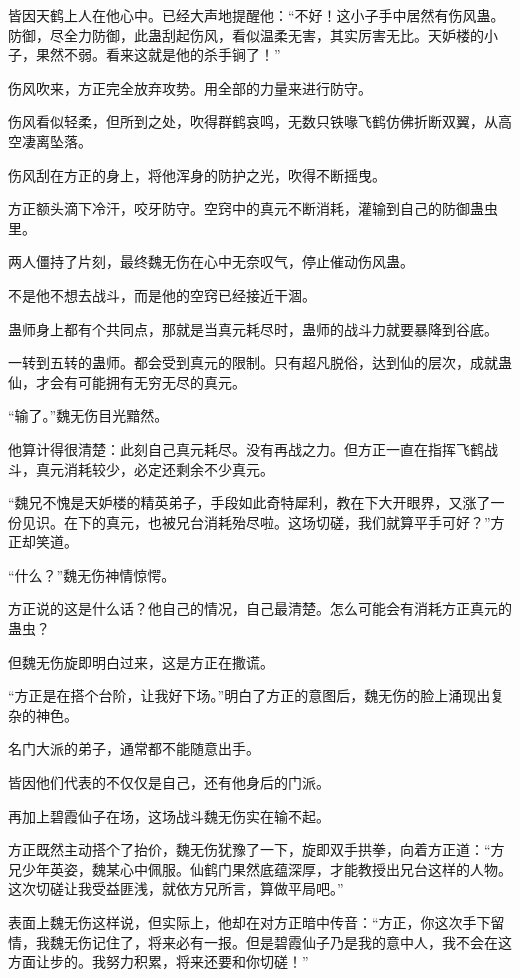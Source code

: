 \begin{this_body}
皆因天鹤上人在他心中。已经大声地提醒他：“不好！这小子手中居然有伤风蛊。防御，尽全力防御，此蛊刮起伤风，看似温柔无害，其实厉害无比。天妒楼的小子，果然不弱。看来这就是他的杀手锏了！”

伤风吹来，方正完全放弃攻势。用全部的力量来进行防守。

伤风看似轻柔，但所到之处，吹得群鹤哀鸣，无数只铁喙飞鹤仿佛折断双翼，从高空凄离坠落。

伤风刮在方正的身上，将他浑身的防护之光，吹得不断摇曳。

方正额头滴下冷汗，咬牙防守。空窍中的真元不断消耗，灌输到自己的防御蛊虫里。

两人僵持了片刻，最终魏无伤在心中无奈叹气，停止催动伤风蛊。

不是他不想去战斗，而是他的空窍已经接近干涸。

蛊师身上都有个共同点，那就是当真元耗尽时，蛊师的战斗力就要暴降到谷底。

一转到五转的蛊师。都会受到真元的限制。只有超凡脱俗，达到仙的层次，成就蛊仙，才会有可能拥有无穷无尽的真元。

“输了。”魏无伤目光黯然。

他算计得很清楚：此刻自己真元耗尽。没有再战之力。但方正一直在指挥飞鹤战斗，真元消耗较少，必定还剩余不少真元。

“魏兄不愧是天妒楼的精英弟子，手段如此奇特犀利，教在下大开眼界，又涨了一份见识。在下的真元，也被兄台消耗殆尽啦。这场切磋，我们就算平手可好？”方正却笑道。

“什么？”魏无伤神情惊愕。

方正说的这是什么话？他自己的情况，自己最清楚。怎么可能会有消耗方正真元的蛊虫？

但魏无伤旋即明白过来，这是方正在撒谎。

“方正是在搭个台阶，让我好下场。”明白了方正的意图后，魏无伤的脸上涌现出复杂的神色。

名门大派的弟子，通常都不能随意出手。

皆因他们代表的不仅仅是自己，还有他身后的门派。

再加上碧霞仙子在场，这场战斗魏无伤实在输不起。

方正既然主动搭个了抬价，魏无伤犹豫了一下，旋即双手拱拳，向着方正道：“方兄少年英姿，魏某心中佩服。仙鹤门果然底蕴深厚，才能教授出兄台这样的人物。这次切磋让我受益匪浅，就依方兄所言，算做平局吧。”

表面上魏无伤这样说，但实际上，他却在对方正暗中传音：“方正，你这次手下留情，我魏无伤记住了，将来必有一报。但是碧霞仙子乃是我的意中人，我不会在这方面让步的。我努力积累，将来还要和你切磋！”


\end{this_body}
